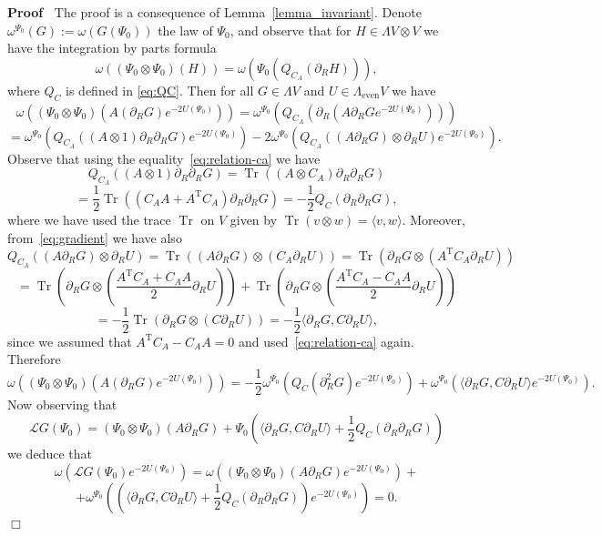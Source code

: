 \documentclass[11pt]{article}
\newcommand{\Tau}{\mathrm{T}}
\newcommand{\assign}{:=}
\newcommand{\tmop}[1]{\ensuremath{\operatorname{#1}}}
\newenvironment{proof}{\noindent\textbf{Proof\ }}{\hspace*{\fill}$\Box$\medskip}
\begin{document}
\begin{proof}
  The proof is a consequence of Lemma~\ref{lemma_invariant}. Denote
  $\omega^{\Psi_0} (G) \assign \omega (G (\Psi_0))$ the law of $\Psi_0$, and
  observe that for $H \in \Lambda V \otimes V$ we have the integration by
  parts formula
  \[ \omega ((\Psi_0 \otimes \Psi_0) (H)) = \omega (\Psi_0 (Q_{C_A}
     (\partial_R H))), \]
  where $Q_C$ is defined in {\eqref{eq:QC}}. Then for all $G \in \Lambda V$
  and $U \in \Lambda_{\tmop{even}} V$ we have
  \[ \omega ((\Psi_0 \otimes \Psi_0) (A (\partial_R G) e^{- 2 U (\Psi_0)})) =
     \omega^{\Psi_0} (Q_{C_A} (\partial_R (A \partial_R G e^{- 2 U
     (\Psi_0)}))) \]
  \[ = \omega^{\Psi_0} (Q_{C_A} ((A \otimes 1) \partial_R \partial_R G) e^{- 2
     U (\Psi_0)}) - 2 \omega^{\Psi_0} (Q_{C_A} ((A \partial_R G) \otimes
     \partial_R U) e^{- 2 U (\Psi_0)}) . \]
  Observe that using the equality~{\eqref{eq:relation-ca}} we have
  \[ Q_{C_A} ((A \otimes 1) \partial_R \partial_R G) = \tmop{Tr} ((A \otimes
     C_A) \partial_R \partial_R G) \]
  \[ = \frac{1}{2} \tmop{Tr} ((C_A A + A^{\Tau} C_A) \partial_R \partial_R G)
     = - \frac{1}{2} Q_C (\partial_R \partial_R G), \]
  where we have used the trace $\tmop{Tr}$ on $V$ given by $\tmop{Tr} (v
  \otimes w) = \langle v, w \rangle$. Moreover, from~{\eqref{eq:gradient}} we
  have also
  \[ Q_{C_A} ((A \partial_R G) \otimes \partial_R U) = \tmop{Tr} ((A
     \partial_R G) \otimes (C_A \partial_R U)) = \tmop{Tr} (\partial_R G
     \otimes (A^{\Tau} C_A \partial_R U)) \]
  \[ = \tmop{Tr} \left( \partial_R G \otimes \left( \frac{A^{\Tau} C_A + C_A
     A}{2} \partial_R U \right) \right) + \tmop{Tr} \left( \partial_R G
     \otimes \left( \frac{A^{\Tau} C_A - C_A A}{2} \partial_R U \right)
     \right) \]
  \[ = - \frac{1}{2} \tmop{Tr} (\partial_R G \otimes (C \partial_R U)) = -
     \frac{1}{2} \langle \partial_R G, C \partial_R U \rangle, \]
  since we assumed that $A^{\Tau} C_A - C_A A = 0$ and
  used~{\eqref{eq:relation-ca}} again. Therefore
  \[ \omega ((\Psi_0 \otimes \Psi_0) (A (\partial_R G) e^{- 2 U (\Psi_0)})) =
     - \frac{1}{2} \omega^{\Psi_0} (Q_C (\partial_R^2 G) e^{- 2 U (\Psi_0)}) +
     \omega^{\Psi_0} (\langle \partial_R G, C \partial_R U \rangle e^{- 2 U
     (\Psi_0)}) . \]
  Now observing that
  \[ \mathcal{L}G (\Psi_0) = (\Psi_0 \otimes \Psi_0) (A \partial_R G) + \Psi_0
     \left( \langle \partial_R G, C \partial_R U \rangle + \frac{1}{2} Q_C
     (\partial_R \partial_R G) \right) \]
  we deduce that
  \[ \omega (\mathcal{L}G (\Psi_0) e^{- 2 U (\Psi_0)}) = \omega ((\Psi_0
     \otimes \Psi_0) (A \partial_R G) e^{- 2 U (\Psi_0)}) + \]
  \[ + \omega^{\Psi_0} \left( \left( \langle \partial_R G, C \partial_R U
     \rangle + \frac{1}{2} Q_C (\partial_R \partial_R G)  \right) e^{- 2 U
     (\Psi_0)} \right) = 0. \]
\end{proof}
\end{document}
